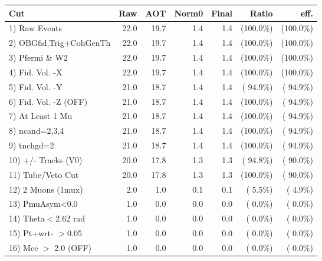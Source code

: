  \begin{table}[h!]\centering
 \begin{tabular}{||l||r|r|r|r|r|r||}
 \hline
 \hline
 Cut & Raw & AOT & Norm0 & Final & Ratio & eff.       \\
 \hline
  1) Raw Events           &         22.0 &         19.7 &          1.4 &          1.4 & (100.0\%) & (100.0\%) \\
  2) OBGfid,Trig+CohGenTh &         22.0 &         19.7 &          1.4 &          1.4 & (100.0\%) & (100.0\%) \\
  3) Pfermi \& W2         &         22.0 &         19.7 &          1.4 &          1.4 & (100.0\%) & (100.0\%) \\
  4) Fid. Vol. -X         &         22.0 &         19.7 &          1.4 &          1.4 & (100.0\%) & (100.0\%) \\
  5) Fid. Vol. -Y         &         21.0 &         18.7 &          1.4 &          1.4 & ( 94.9\%) & ( 94.9\%) \\
  6) Fid. Vol. -Z (OFF)   &         21.0 &         18.7 &          1.4 &          1.4 & (100.0\%) & ( 94.9\%) \\
  7) At Least 1 Mu        &         21.0 &         18.7 &          1.4 &          1.4 & (100.0\%) & ( 94.9\%) \\
  8) ncand=2,3,4          &         21.0 &         18.7 &          1.4 &          1.4 & (100.0\%) & ( 94.9\%) \\
  9) tnchgd=2             &         21.0 &         18.7 &          1.4 &          1.4 & (100.0\%) & ( 94.9\%) \\
 10) +/- Tracks (V0)      &         20.0 &         17.8 &          1.3 &          1.3 & ( 94.8\%) & ( 90.0\%) \\
 11) Tube/Veto Cut        &         20.0 &         17.8 &          1.3 &          1.3 & (100.0\%) & ( 90.0\%) \\
 12) 2 Muons (1mux)       &          2.0 &          1.0 &          0.1 &          0.1 & (  5.5\%) & (  4.9\%) \\
 13) PmuAsym<0.0          &          1.0 &          0.0 &          0.0 &          0.0 & (  0.0\%) & (  0.0\%) \\
 14) Theta$<$2.62 rad     &          1.0 &          0.0 &          0.0 &          0.0 & (  0.0\%) & (  0.0\%) \\
 15) Pt+wrt- $>$0.05      &          1.0 &          0.0 &          0.0 &          0.0 & (  0.0\%) & (  0.0\%) \\
 16) Mee $>$ 2.0  (OFF)   &          1.0 &          0.0 &          0.0 &          0.0 & (  0.0\%) & (  0.0\%) \\

\end{tabular}
\end{table}
